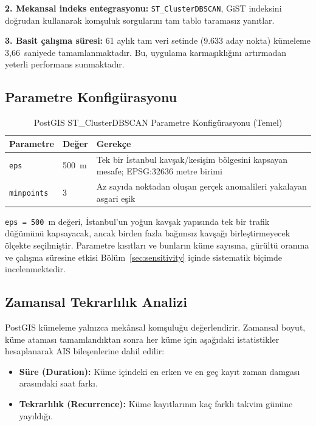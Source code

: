 \documentclass[12pt,a4paper]{article}
\begin{document}
\textbf{2. Mekansal indeks entegrasyonu:} \texttt{ST\_ClusterDBSCAN}, GiST indeksini doğrudan kullanarak komşuluk sorgularını tam tablo taramasız yanıtlar.

\textbf{3. Basit çalışma süresi:} 61 aylık tam veri setinde (9.633 aday nokta) kümeleme 3,66~saniyede tamamlanmaktadır. Bu, uygulama karmaşıklığını artırmadan yeterli performans sunmaktadır.

\subsection{Parametre Konfigürasyonu}

\begin{table}[H]
\centering
\caption{PostGIS ST\_ClusterDBSCAN Parametre Konfigürasyonu (Temel)}
\label{tab:dbscan-params}
\begin{tabular}{l l l}
\toprule
\textbf{Parametre} & \textbf{Değer} & \textbf{Gerekçe} \\
\midrule
\texttt{eps}       & 500~m  & Tek bir İstanbul kavşak/kesişim bölgesini kapsayan mesafe; EPSG:32636 metre birimi \\
\texttt{minpoints} & 3      & Az sayıda noktadan oluşan gerçek anomalileri yakalayan asgari eşik \\
\bottomrule
\end{tabular}
\end{table}

\texttt{eps = 500}~m değeri, İstanbul'un yoğun kavşak yapısında tek bir trafik düğümünü kapsayacak, ancak birden fazla bağımsız kavşağı birleştirmeyecek ölçekte seçilmiştir. Parametre kısıtları ve bunların küme sayısına, gürültü oranına ve çalışma süresine etkisi Bölüm~\ref{sec:sensitivity} içinde sistematik biçimde incelenmektedir.

\subsection{Zamansal Tekrarlılık Analizi}

PostGIS kümeleme yalnızca mekânsal komşuluğu değerlendirir. Zamansal boyut, küme ataması tamamlandıktan sonra her küme için aşağıdaki istatistikler hesaplanarak AIS bileşenlerine dahil edilir:

\begin{itemize}
    \item \textbf{Süre (Duration):} Küme içindeki en erken ve en geç kayıt zaman damgası arasındaki saat farkı.
    \item \textbf{Tekrarlılık (Recurrence):} Küme kayıtlarının kaç farklı takvim gününe yayıldığı.
\end{itemize}
\end{document}
